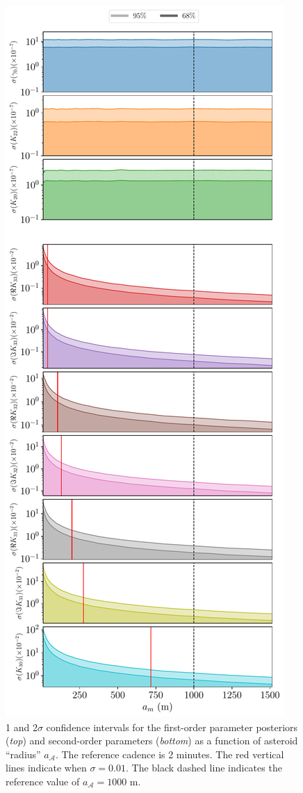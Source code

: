 \documentclass[fleqn,usenatbib]{mnras}
\begin{document}
\begin{figure}
  \centering
  \includegraphics[height=0.89\textheight]{figs/scan-am.pdf}
  \caption{1 and 2$\sigma$ confidence intervals for the first-order parameter posteriors (\textit{top}) and second-order parameters (\textit{bottom}) as a function of asteroid ``radius'' $a_\mathcal{A}$. The reference cadence is 2 minutes. The red vertical lines indicate when $\sigma = 0.01$. The black dashed line indicates the reference value of $a_\mathcal{A}=1000$ m.}
  \label{fig:scan-am}
\end{figure}
\end{document}
